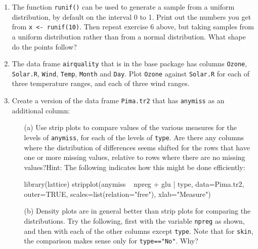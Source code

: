 \documentclass{tufte-book}\usepackage[]{graphicx}\usepackage[]{color}
\newcommand{\txtt}[1]{\texttt{#1}}
\begin{document}
\begin{enumerate}
\item The function \txtt{runif()} can be used to generate a sample
  from a uniform distribution, by default on the interval 0 to
  1. Print out the numbers you get from \txtt{x \txtt{<}-
    runif(10)}. Then repeat exercise 6 above, but taking samples from
  a uniform distribution rather than from a normal distribution.  What
  shape do the points follow?

\item The data frame \txtt{airquality} that is in the base package has
  columns \txtt{Ozone}, \txtt{Solar.R}, \txtt{Wind},
  \txtt{Temp}, \txtt{Month} and \txtt{Day}. Plot
  \txtt{Ozone} against \txtt{Solar.R} for each of three
  temperature ranges, and each of three wind ranges.
\item Create a version of the data frame \texttt{Pima.tr2} that has
  \texttt{anymiss} as an additional column:
\begin{Schunk}
\end{Schunk}
\begin{itemize}
\item[(a)] Use strip plots to compare values of the various measures for
the levels of \texttt{anymiss}, for each of the levels of \texttt{type}.
  Are there any columns where the distribution of differences seems
  shifted for the rows that have one or more missing values, relative
  to rows where there are no missing values?\newline Hint: The
  following indicates how this might be done efficiently:
\begin{fullwidth}

\begin{Schunk}
\begin{Sinput}
library(lattice)
stripplot(anymiss ~ npreg + glu | type, data=Pima.tr2, outer=TRUE,
          scales=list(relation="free"), xlab="Measure")
\end{Sinput}
\end{Schunk}

\end{fullwidth}
\item[(b)] Density plots are in general better than strip plots for
  comparing the distributions. Try the following, first with the
  variable \texttt{npreg} as shown, and then with each of the other
  columns except \texttt{type}. Note that for \texttt{skin}, the comparison
  makes sense only for \texttt{type=="No"}. Why?
\begin{fullwidth}


\end{fullwidth}
\end{itemize}
\end{enumerate}
\end{document}
